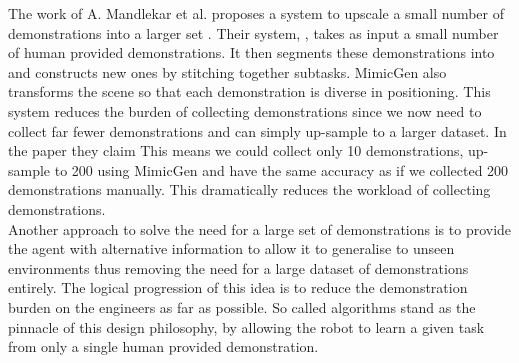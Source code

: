 The work of A. Mandlekar et al. proposes a system to upscale a small number of demonstrations into a larger set \cite{mimicgen}. Their system, , takes as input a small number of human provided demonstrations. It then segments these demonstrations into  and constructs new ones by stitching together subtasks. MimicGen also transforms the scene so that each demonstration is diverse in positioning. This system reduces the burden of collecting demonstrations since we now need to collect far fewer demonstrations and can simply up-sample to a larger dataset. In the paper they claim  This means we could collect only 10 demonstrations, up-sample to 200 using MimicGen and have the same accuracy as if we collected 200 demonstrations manually. This dramatically reduces the workload of collecting demonstrations.\\

Another approach to solve the need for a large set of demonstrations is to provide the agent with alternative information to allow it to generalise to unseen environments thus removing the need for a large dataset of demonstrations entirely. The logical progression of this idea is to reduce the demonstration burden on the engineers as far as possible. So called  algorithms stand as the pinnacle of this design philosophy, by allowing the robot to learn a given task from only a single human provided demonstration.\\

